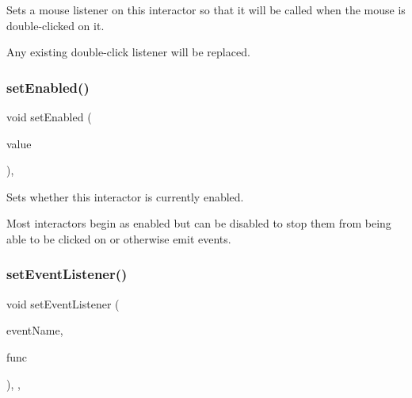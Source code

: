 Sets a mouse listener on this interactor so that it will be called when the mouse is double-\/clicked on it. 

Any existing double-\/click listener will be replaced. \mbox{\label{classsgl_1_1GInteractor_ab831367dd84bbd579e02e55bacb21343}} 
\subsubsection{\texorpdfstring{set\+Enabled()}{setEnabled()}}
{\footnotesize\ttfamily void set\+Enabled (\begin{DoxyParamCaption}\item[{bool}]{value }\end{DoxyParamCaption})\hspace{0.3cm}{\ttfamily [virtual]}, {\ttfamily [inherited]}}



Sets whether this interactor is currently enabled. 

Most interactors begin as enabled but can be disabled to stop them from being able to be clicked on or otherwise emit events. \mbox{\label{classsgl_1_1GObservable_ad2f6d34961c50f6c1e0659990b79f741}} 
\subsubsection{\texorpdfstring{set\+Event\+Listener()}{setEventListener()}\hspace{0.1cm}{\footnotesize\ttfamily [1/2]}}
{\footnotesize\ttfamily void set\+Event\+Listener (\begin{DoxyParamCaption}\item[{const std\+::string \&}]{event\+Name,  }\item[{\mbox{\hyperlink{namespacesgl_ae9f3e9eab70035da1a2b114e21357b25}{G\+Event\+Listener}}}]{func }\end{DoxyParamCaption})\hspace{0.3cm}{\ttfamily [protected]}, {\ttfamily [virtual]}, {\ttfamily [inherited]}}



